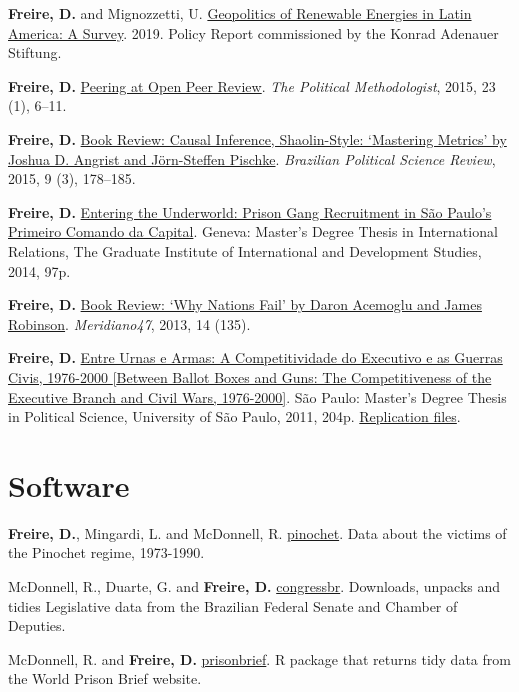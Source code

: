 \documentclass[a4paper]{article}
\renewenvironment{itemize}{
	\begin{list}{}{
			\setlength{\leftmargin}{1.5em}
		}
		}{
	\end{list}
}
\begin{document}
\begin{itemize}
\item \textbf{Freire, D.} and Mignozzetti, U.  \href{https://www.kas.de/documents/273477/273526/Geopolitics+of+Renewable+Energy+in+Latin+America+-+A+Survey.pdf/9fe39ef1-6028-0836-90b0-aada31cb6769?version=1.0&t=1551887777018}{Geopolitics of Renewable Energies in Latin America: A Survey}. 2019. Policy Report commissioned by the Konrad Adenauer Stiftung.
\item \textbf{Freire, D.} \href{https://thepoliticalmethodologist.files.wordpress.com/2016/02/tpm_v23_n1.pdf}{Peering at Open Peer Review}. \textit{The Political Methodologist}, 2015, 23 (1), 6--11.
\item \textbf{Freire, D.} \href{http://www.scielo.br/readcube/epdf.php?doi=10.1590/1981-38212015000300026&pid=S1981-38212015000300178&pdf_path=bpsr/v9n3/1981-3821-bpsr-9-3-0178.pdf&lang=en}{Book Review: Causal Inference, Shaolin-Style: `Mastering Metrics' by Joshua D. Angrist and J\"{o}rn-Steffen Pischke}. \textit{Brazilian Political Science Review}, 2015, 9 (3), 178--185.
\item \textbf{Freire, D.} \href{http://dx.doi.org/10.6084/m9.figshare.1209203}{Entering the Underworld: Prison Gang Recruitment in S\~{a}o Paulo's Primeiro Comando da Capital}. Geneva: Master's Degree Thesis in International Relations, The Graduate Institute of International and Development Studies, 2014, 97p.
\item \textbf{Freire, D.} \href{http://seer.bce.unb.br/index.php/MED/article/view/7505/6497}{Book Review: `Why Nations Fail' by Daron Acemoglu and James Robinson}. \textit{Meridiano47}, 2013, 14 (135).
\item \textbf{Freire, D.} \href{http://dx.doi.org/10.6084/m9.figshare.963082}{Entre Urnas e Armas: A Competitividade do Executivo e as Guerras Civis, 1976-2000 {[}Between Ballot Boxes and Guns: The Competitiveness of the Executive Branch and Civil Wars, 1976-2000{]}}. S\~{a}o Paulo: Master's Degree Thesis in Political Science, University of S\~{a}o Paulo, 2011, 204p. \href{http://dx.doi.org/10.6084/m9.figshare.963183}{Replication files}.
\end{itemize}

\section*{Software}

\begin{itemize}
\item \textbf{Freire, D.}, Mingardi, L. and McDonnell, R. \href{http://danilofreire.github.io/pinochet}{pinochet}. Data about the victims of the Pinochet regime, 1973-1990.
\item McDonnell, R., Duarte, G. and \textbf{Freire, D.} \href{https://github.com/RobertMyles/congressbr}{congressbr}. Downloads, unpacks and tidies Legislative data from the Brazilian Federal Senate and Chamber of Deputies.
\item McDonnell, R. and \textbf{Freire, D.} \href{http://danilofreire.github.io/prisonbrief}{prisonbrief}. R package that returns tidy data from the World Prison Brief website.
\end{itemize}
\end{document}
